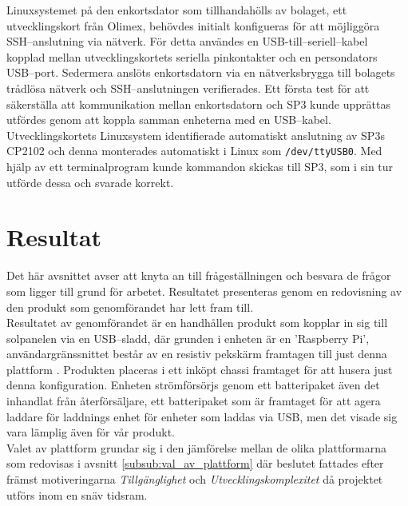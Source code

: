 \documentclass{article}
\begin{document}
            Linuxsystemet på den enkortsdator som tillhandahölls av bolaget, ett utvecklingskort från Olimex, behövdes initialt konfigueras för att möjliggöra SSH--anslutning via nätverk. För detta användes en USB-till--seriell--kabel kopplad mellan utvecklings\-kortets seriella pinkontakter och en persondators USB--port. Seder\-mera anslöts enkortsdatorn via en nätverksbrygga till bolagets trådlösa nätverk och SSH--anslutningen verifierades. Ett första test för att säkerställa att kommunikation mellan enkortsdatorn och SP3 kunde upprättas utfördes genom att koppla samman enheterna med en USB--kabel. Utvecklings\-kortets Linuxsystem identifierade automatiskt anslutning av SP3s CP2102 och denna monterades automatiskt i \hbox{Linux} som \texttt{/dev/ttyUSB0}. Med hjälp av ett terminal\-program kunde kommandon skickas till SP3, som i sin tur utförde dessa och svarade korrekt.

    \newpage

    \section{Resultat} %
    \label{sec:resultat}
        Det här avsnittet avser att knyta an till frågeställningen och besvara de frågor som ligger till grund för arbetet. Resultatet presenteras genom en redovisning av den produkt som genomförandet har lett fram till. \\

        \noindent Resultatet av genomförandet är en handhållen produkt som kopplar in sig till sol\-panel\-en via en USB--sladd, där grunden i enheten är en 'Raspberry Pi', användargränssnittet består av en resistiv pekskärm framtagen till just denna plattform \cite{Ada}. Produkten placeras i ett inköpt chassi framtaget för att husera just denna konfiguration. Enheten strömförsörjs genom ett batteripaket även det inhandlat från återförsäljare, ett batteripaket som är framtaget för att agera laddare för laddnings enhet för enheter som laddas via USB, men det visade sig vara lämplig även för vår produkt. \\

        \noindent Valet av plattform grundar sig i den jämförelse mellan de olika plattformarna som redovisas i avsnitt \ref{subsub:val_av_plattform} där beslutet fattades efter främst motiveringarna \emph{Tillgänglighet} och \emph{Utvecklingskomplexitet} då projektet utförs inom en snäv tidsram.\\
\end{document}
